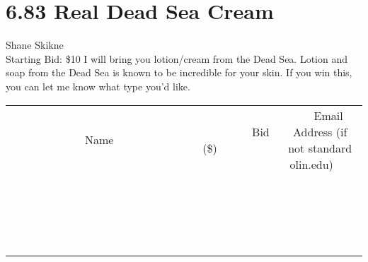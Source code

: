 \documentclass[11pt]{article}
\begin{document}
\section*{6.83 Real Dead Sea Cream}
Shane Skikne
\\
Starting Bid: \$10
\newline
I will bring you lotion/cream from the Dead Sea. Lotion and soap from the Dead Sea is known to be incredible for your skin. If you win this, you can let me know what type you'd like.
\\[3ex]
\begin{tabular}{c c c}
~~~~~~~~~~~~~Name~~~~~~~~~~~~~ & ~~~~~~~~~Bid (\$)~~~~~~~~~  & ~~~Email Address (if not standard olin.edu)~~~\\
 & & \\
\hline
 & & \\
\hline
 & & \\
\hline
 & & \\
\hline
 & & \\
\hline
 & & \\
\hline
 & & \\
\hline
 & & \\
\hline
 & & \\
\hline
 & & \\
\hline
 & & \\
\hline
 & & \\
\hline
 & & \\
\hline
 & & \\
\hline
 & & \\
\hline
 & & \\
\hline
 & & \\
\hline
 & & \\
\hline
 & & \\
\hline
\end{tabular}
\newpage
\end{document}
